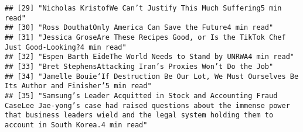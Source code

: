 \documentclass[
]{article}
\begin{document}
\begin{verbatim}
## [29] "Nicholas KristofWe Can’t Justify This Much Suffering5 min read"                                                                                                                                                                                                                                                                                                                                                       
## [30] "Ross DouthatOnly America Can Save the Future4 min read"                                                                                                                                                                                                                                                                                                                                                               
## [31] "Jessica GroseAre These Recipes Good, or Is the TikTok Chef Just Good-Looking?4 min read"                                                                                                                                                                                                                                                                                                                              
## [32] "Espen Barth EideThe World Needs to Stand by UNRWA4 min read"                                                                                                                                                                                                                                                                                                                                                          
## [33] "Bret StephensAttacking Iran’s Proxies Won’t Do the Job"                                                                                                                                                                                                                                                                                                                                                               
## [34] "Jamelle Bouie‘If Destruction Be Our Lot, We Must Ourselves Be Its Author and Finisher’5 min read"                                                                                                                                                                                                                                                                                                                     
## [35] "Samsung’s Leader Acquitted in Stock and Accounting Fraud CaseLee Jae-yong’s case had raised questions about the immense power that business leaders wield and the legal system holding them to account in South Korea.4 min read"                                                                                                                                                                                     

\end{verbatim}
\end{document}
